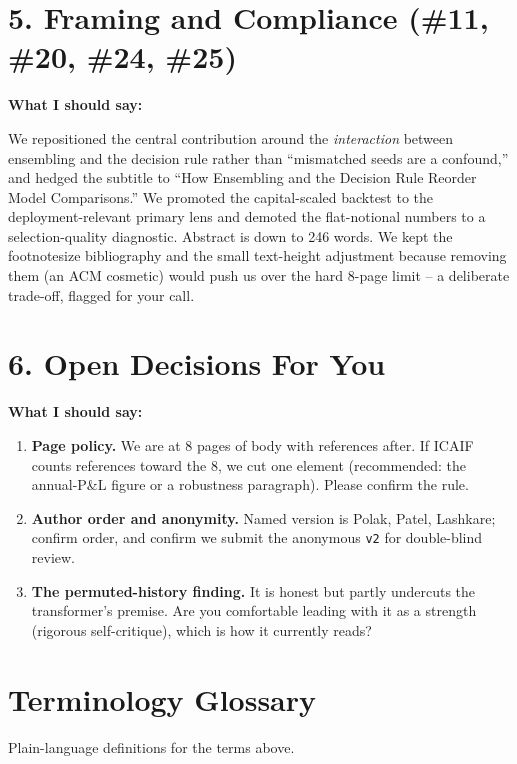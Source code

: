 \documentclass[11pt]{article}
\begin{document}
\section*{5. Framing and Compliance (\#11, \#20, \#24, \#25)}
\textbf{What I should say:}

We repositioned the central contribution around the \emph{interaction} between ensembling and the decision rule rather than ``mismatched seeds are a confound,'' and hedged the subtitle to ``How Ensembling and the Decision Rule Reorder Model Comparisons.'' We promoted the capital-scaled backtest to the deployment-relevant primary lens and demoted the flat-notional numbers to a selection-quality diagnostic. Abstract is down to 246 words. We kept the footnotesize bibliography and the small text-height adjustment because removing them (an ACM cosmetic) would push us over the hard 8-page limit -- a deliberate trade-off, flagged for your call.

\section*{6. Open Decisions For You}
\textbf{What I should say:}

\begin{enumerate}
\item \textbf{Page policy.} We are at 8 pages of body with references after. If ICAIF counts references toward the 8, we cut one element (recommended: the annual-P\&L figure or a robustness paragraph). Please confirm the rule.
\item \textbf{Author order and anonymity.} Named version is Polak, Patel, Lashkare; confirm order, and confirm we submit the anonymous \texttt{v2} for double-blind review.
\item \textbf{The permuted-history finding.} It is honest but partly undercuts the transformer's premise. Are you comfortable leading with it as a strength (rigorous self-critique), which is how it currently reads?
\end{enumerate}

\newpage
\section*{Terminology Glossary}
Plain-language definitions for the terms above.
\end{document}
